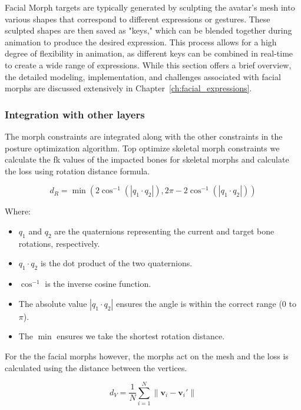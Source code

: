 \documentclass[../../main.tex]{subfiles}
\begin{document}
{Facial Morph targets are typically generated by sculpting the avatar's mesh into various shapes that correspond to different expressions or gestures. These sculpted shapes are then saved as "keys," which can be blended together during animation to produce the desired expression. This process allows for a high degree of flexibility in animation, as different keys can be combined in real-time to create a wide range of expressions. While this section offers a brief overview, the detailed modeling, implementation, and challenges associated with facial morphs are discussed extensively in Chapter~\ref{ch:facial_expressions}.

\subsubsection{Integration with other layers}
\label{ch:avatar_creation_pose_synthesis:proc_rig_signing_avatars:morph_constraints:intergation}

The morph constraints are integrated along with the other constraints in the posture optimization algorithm. Top optimize skeletal morph constraints we calculate the \gls{fk} values of the impacted bones for skeletal morphs and calculate the loss using rotation distance formula.

\[
d_R = \min\left( 2 \cos^{-1}\left( \left| q_1 \cdot q_2 \right| \right), 2\pi - 2 \cos^{-1}\left( \left| q_1 \cdot q_2 \right| \right) \right)
\]

Where:
\begin{itemize}
    \item \( q_1 \) and \( q_2 \) are the quaternions representing the current and target bone rotations, respectively.
    \item \( q_1 \cdot q_2 \) is the dot product of the two quaternions.
    \item \( \cos^{-1} \) is the inverse cosine function.
    \item The absolute value \( | q_1 \cdot q_2 | \) ensures the angle is within the correct range (0 to \( \pi \)).
    \item The \( \min \) ensures we take the shortest rotation distance.
\end{itemize}

For the the facial morphs however, the morphs act on the mesh and the loss is calculated using the distance between the vertices.

\[
d_V = \frac{1}{N} \sum_{i=1}^{N} \| \mathbf{v}_i - \mathbf{v}_i' \|
\]

}
\end{document}
